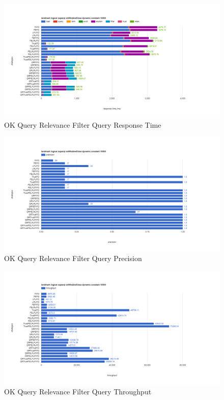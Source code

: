\begin{figure}[!htbp]
    \centering
    \includegraphics[width=\textwidth]{img/app3-oqr-r.png}
    \caption{OK Query Relevance Filter Query Response Time}
\end{figure}
\begin{figure}[!htbp]
    \centering
    \includegraphics[width=\textwidth]{img/app3-oqr-p.png}
    \caption{OK Query Relevance Filter Query Precision}
\end{figure}
\begin{figure}[!htbp]
    \centering
    \includegraphics[width=\textwidth]{img/app3-oqr-t.png}
    \caption{OK Query Relevance Filter Query Throughput}
\end{figure}
